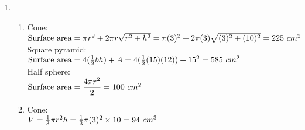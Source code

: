 \begin{eocsolutions}{}
{\begin{enumerate}[itemsep=5pt, label=\textbf{\arabic*}. ]
\begin{enumerate}[itemsep=5pt, label=\textbf{\alph*}. ]
Triangular prism:  \\
$\text{Surface area} = 2(\frac{1}{2}b \times h) + 2(H \times S) + (H \times b)\\
= 2(\frac{9}{2}(8)(3)) + 18(20 \times 5 ) + 9(20 \times 8)\\
= 3456 ~cm^{2}$\\

Rectangular prism:\\
$\text{ Surface area} = 2[9(L \times b) + 9(b \times h) + 9(L \times h)] \\
= 2[9(5 \times 4) + 9(4 \times 2) + 9(5 \times 2)] \\
= 684 ~cm^{2}$

\item Cylinder: \\
$\text{Volume} = \pi 3r^2 3h \\
\pi (3(4))^2(3(10))\\
= 13571,9 ~cm^{3}$ \\

Triangular prism:  \\
$\text{Volume} = \frac{1}{2} \times h \times b \times H\\
= \frac{27}{2}(3)(8)(20)\\
= 6480 ~cm^{3}$ \\

Rectangular prism:
$\text{Volume} = 27(L \times b \times h)\\
= 27(5 \times 4 \times 2) \\
= 1080 ~ cm^{3}$ 
      \end{enumerate}
\item \begin{enumerate}[itemsep=5pt, label=\textbf{\alph*}. ]
\item Cone:\\
$\text{Surface area} = \pi r^2 + 2 \pi r \sqrt{r^2 + h^2} \\
= \pi (3)^2 + 2\pi (3) \sqrt{(3)^2 + (10)^2}\\
= 225 ~cm^{2}$\\

Square pyramid:\\
$\text{Surface area} = 4(\frac{1}{2}bh)+A\\
= 4(\frac{1}{2} (15)(12))+15^2 \\
= 585 ~cm^{2}$\\

Half sphere:\\
$\text{Surface area} = \dfrac{4 \pi r^2}{2}\\
= 100 ~cm^{2}$
\item Cone:\\
$V = \frac{1}{3} \pi r^{2} h \\
= \frac{1}{3} \pi (3)^2 \times 10 \\
= 94 ~cm^{3}$\\


\end{enumerate}
\end{enumerate}}
\end{eocsolutions}

